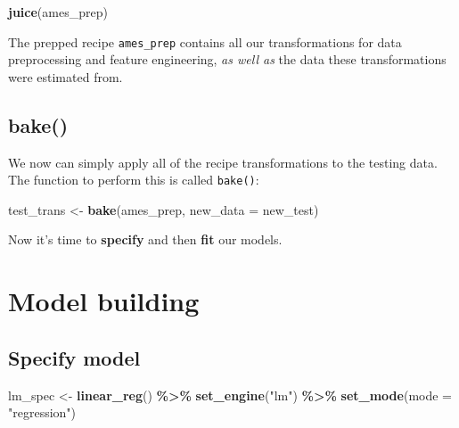 \documentclass[
]{book}
\newenvironment{Shaded}{\begin{snugshade}}{\end{snugshade}}
\newcommand{\DataTypeTok}[1]{\textcolor[rgb]{0.13,0.29,0.53}{#1}}
\newcommand{\KeywordTok}[1]{\textcolor[rgb]{0.13,0.29,0.53}{\textbf{#1}}}
\newcommand{\NormalTok}[1]{#1}
\newcommand{\OperatorTok}[1]{\textcolor[rgb]{0.81,0.36,0.00}{\textbf{#1}}}
\newcommand{\StringTok}[1]{\textcolor[rgb]{0.31,0.60,0.02}{#1}}
\begin{document}
\begin{Shaded}
\begin{Highlighting}[]
\KeywordTok{juice}\NormalTok{(ames\_prep)}
\end{Highlighting}
\end{Shaded}

The prepped recipe \texttt{ames\_prep} contains all our transformations for data preprocessing and feature engineering, \emph{as well as} the data these transformations were estimated from.

\hypertarget{bake}{%
\section{bake()}\label{bake}}

We now can simply apply all of the recipe transformations to the testing data. The function to perform this is called \texttt{bake()}:

\begin{Shaded}
\begin{Highlighting}[]
\NormalTok{test\_trans \textless{}{-}}\StringTok{ }\KeywordTok{bake}\NormalTok{(ames\_prep, }\DataTypeTok{new\_data =}\NormalTok{ new\_test)}
\end{Highlighting}
\end{Shaded}

Now it's time to \textbf{specify} and then \textbf{fit} our models.

\hypertarget{model-building}{%
\chapter{Model building}\label{model-building}}

\hypertarget{specify-model}{%
\section{Specify model}\label{specify-model}}

\begin{Shaded}
\begin{Highlighting}[]
\NormalTok{lm\_spec \textless{}{-}}
\StringTok{  }\KeywordTok{linear\_reg}\NormalTok{() }\OperatorTok{\%\textgreater{}\%}
\StringTok{  }\KeywordTok{set\_engine}\NormalTok{(}\StringTok{"lm"}\NormalTok{) }\OperatorTok{\%\textgreater{}\%}
\StringTok{  }\KeywordTok{set\_mode}\NormalTok{(}\DataTypeTok{mode =} \StringTok{"regression"}\NormalTok{)}
\end{Highlighting}
\end{Shaded}
\end{document}

